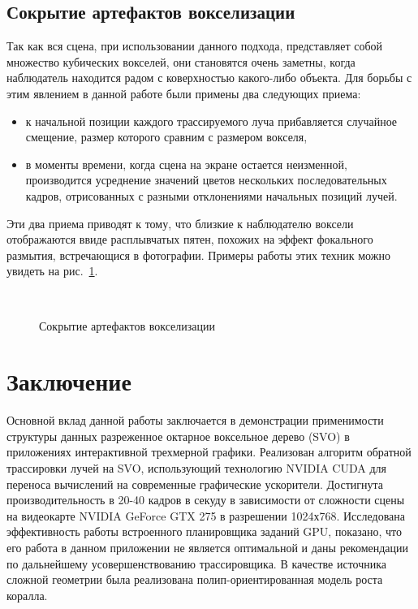 \documentclass[a4paper,14pt]{extreport}
\begin{document}
\section{Сокрытие артефактов вокселизации}

Так как вся сцена, при использовании данного подхода, представляет собой множество кубических вокселей, они становятся очень заметны, когда наблюдатель находится радом с коверхностью какого-либо объекта. Для борьбы с этим явлением в данной работе были примены два следующих приема:
\begin{itemize}
\item к начальной позиции каждого трассируемого луча прибавляется случайное смещение, размер которого сравним с размером вокселя,
\item в моменты времени, когда сцена на экране остается неизменной, производится усреднение значений цветов нескольких последовательных кадров, отрисованных с разными отклонениями начальных позиций лучей.
\end{itemize}
Эти два приема приводят к тому, что близкие к наблюдателю воксели отображаются ввиде расплывчатых пятен, похожих на эффект фокального размытия, встречающися в фотографии. Примеры работы этих техник можно увидеть на рис.~\ref{fig:voxel_blur}.

\begin{figure}[h]
  \begin{center}
     \\
  \end{center}
  \caption{Сокрытие артефактов вокселизации}
  \label{fig:voxel_blur}
\end{figure}



\chapter*{Заключение}

Основной вклад данной работы заключается в демонстрации применимости структуры данных разреженное октарное воксельное дерево (SVO) в приложениях интерактивной трехмерной графики. Реализован алгоритм обратной трассировки лучей на SVO, использующий технологию NVIDIA CUDA для переноса вычислений на современные графические ускорители. Достигнута производительность в 20-40 кадров в секуду в зависимости от сложности сцены на видеокарте NVIDIA GeForce GTX 275 в разрешении 1024х768. Исследована эффективность работы встроенного планировщика заданий GPU, показано, что его работа в данном приложении не является оптимальной и даны рекомендации по дальнейшему усовершенствованию трассировщика. В качестве источника сложной геометрии была реализована полип-ориентированная модель роста коралла.	
\end{document}
